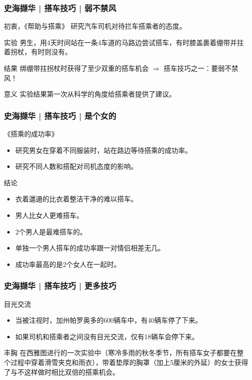 \begin{frame}
  \frametitle{史海撷华 | 搭车技巧 | 弱不禁风}
  \begin{block}{初衷，《帮助与搭乘》}
    研究汽车司机对待拦车搭乘者的态度。
  \end{block}
  \pause
  \begin{block}{实验}
    男生，用4天时间站在一条4车道的马路边尝试搭车，有时膝盖裹着绷带并拄着拐杖，有时则没有。
  \end{block}
  \pause
  \begin{block}{结果}
    绑绷带拄拐杖时获得了至少双重的搭车机会 $\Longrightarrow$ 搭车技巧之一：要弱不禁风！
  \end{block}
  \pause
  \begin{block}{意义}
    实验结果第一次从科学的角度给搭乘者提供了建议。
  \end{block}
\end{frame}

\begin{frame}
  \frametitle{史海撷华 | 搭车技巧 | 是个女的}
  \begin{block}{《搭乘的成功率》}
    \begin{itemize}
      \item 研究男女在穿着不同服装时，站在路边等待搭乘的成功率。
      \item 研究不同人数和搭配对司机态度的影响。
    \end{itemize}
  \end{block}
  \pause
  \begin{block}{结论}
    \begin{itemize}
      \item 衣着邋遢的比衣着整洁干净的难以搭车。
      \item 男人比女人更难搭车。
      \item 2个男人是最难搭车的。
      \item 单独一个男人搭车的成功率跟一对情侣相差无几。
      \item 成功率最高的是2个女人在一起时。
    \end{itemize}
  \end{block}
\end{frame}

\begin{frame}
  \frametitle{史海撷华 | 搭车技巧 | 更多技巧}
  \begin{block}{目光交流}
    \begin{itemize}
      \item 当被注视时，加州帕罗奥多的600辆车中，有40辆车停了下来。
      \item 如果司机和搭乘者之间没有目光交流，仅有18辆车会停下来。
    \end{itemize}
  \end{block}
  \pause
  \begin{block}{丰胸}
在西雅图进行的一次实验中（寒冷多雨的秋冬季节，所有搭车女子都要在整个过程中穿着滑雪夹克和雨衣），带着垫厚的胸罩（加上5厘米的外延）的女士获得了与不这样做时相比双倍的搭乘机会。 
  \end{block}
\end{frame}

